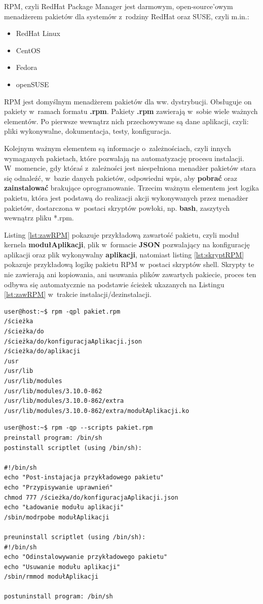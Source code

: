 RPM, czyli RedHat Package Manager jest darmowym, open-source'owym menadżerem pakietów dla systemów z~rodziny RedHat oraz SUSE, czyli m.in.:
\begin{itemize}
\item RedHat Linux
\item CentOS
\item Fedora
\item openSUSE
\end{itemize}\par
RPM jest domyślnym menadżerem pakietów dla ww. dystrybucji. Obsługuje on pakiety w~ramach formatu \textbf{.rpm}. Pakiety \textbf{.rpm} zawierają w~sobie wiele ważnych elementów. Po pierwsze wewnątrz nich przechowywane są dane aplikacji, czyli: pliki wykonywalne, dokumentacja, testy, konfiguracja.\par 
Kolejnym ważnym elementem są informacje o~zależnościach, czyli innych wymaganych pakietach, które pozwalają na automatyzację procesu instalacji. W~momencie, gdy któraś z~zależności jest niespełniona menadżer pakietów stara się odnaleźć, w~bazie danych pakietów, odpowiedni wpis, aby \textbf{pobrać} oraz \textbf{zainstalować} brakujące oprogramowanie. Trzecim ważnym elementem jest logika pakietu, która jest podstawą do realizacji akcji wykonywanych przez menadżer pakietów, dostarczona w~postaci skryptów powłoki, np. \textbf{bash}, zaszytych wewnątrz pliku *.rpm.

Listing \ref{lst:zawRPM} pokazuje przykładową zawartość pakietu, czyli moduł kernela \textbf{modułAplikacji}, plik w~formacie \textbf{JSON} pozwalający na konfigurację aplikacji oraz plik wykonywalny \textbf{aplikacji}, natomiast  listing \ref{lst:skryptRPM} pokazuje przykładową logikę pakietu RPM w~postaci skryptów shell. Skrypty te nie zawierają ani kopiowania, ani usuwania plików zawartych pakiecie, proces ten odbywa się automatycznie na podstawie ścieżek ukazanych na Listingu \ref{lst:zawRPM} w~trakcie instalacji/dezinstalacji.

\begin{lstlisting}[language=Cmd,caption={Przykładowa zawartość pakietu RPM},label={lst:zawRPM}]
user@host:~$ rpm -qpl pakiet.rpm
/ścieżka
/ścieżka/do
/ścieżka/do/konfiguracjaAplikacji.json
/ścieżka/do/aplikacji
/usr
/usr/lib
/usr/lib/modules
/usr/lib/modules/3.10.0-862
/usr/lib/modules/3.10.0-862/extra
/usr/lib/modules/3.10.0-862/extra/modułAplikacji.ko
\end{lstlisting}

\begin{lstlisting}[label={lst:skryptRPM}, language=Cmd, caption={Skrypty pakietu RPM}]
user@host:~$ rpm -qp --scripts pakiet.rpm
preinstall program: /bin/sh
postinstall scriptlet (using /bin/sh):

#!/bin/sh
echo "Post-instajacja przykładowego pakietu"
echo "Przypisywanie uprawnień"
chmod 777 /ścieżka/do/konfiguracjaAplikacji.json
echo "Ładowanie modułu aplikacji"
/sbin/modrpobe modułAplikacji

preuninstall scriptlet (using /bin/sh):
#!/bin/sh
echo "Odinstalowywanie przykładowego pakietu"
echo "Usuwanie modułu aplikacji"
/sbin/rmmod modułAplikacji

postuninstall program: /bin/sh
\end{lstlisting}

